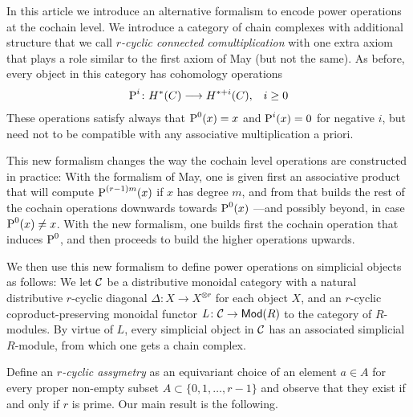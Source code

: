 In this article we introduce an alternative formalism to encode power operations at the cochain level. We introduce a category of chain complexes with additional structure that we call \emph{$r$-cyclic connected comultiplication} with one extra axiom that plays a role similar to the first axiom of May (but not the same). As before, every object in this category has cohomology operations
\begin{align*}
    \operatorname{P}^i\colon H^*(C)&\longrightarrow H^{*+i}(C), &i\geq 0
\end{align*}
These operations satisfy always that $\operatorname{P}^0(x) = x$ and $\operatorname{P}^{i}(x) = 0$ for negative $i$, but need not to be compatible with any associative multiplication a priori. %

This new formalism changes the way the cochain level operations are constructed in practice: With the formalism of May, one is given first an associative product that will compute $\operatorname{P}^{(r-1)m}(x)$ if $x$ has degree $m$, and from that builds the rest of the cochain operations downwards towards $\operatorname{P}^0(x)$ ---and possibly beyond, in case $\operatorname{P}^0(x)\neq x$. With the new formalism, one builds first the cochain operation that induces $\operatorname{P}^0$, and then proceeds to build the higher operations upwards.

We then use this new formalism to define power operations on simplicial objects as follows: We let $\mathcal{C}$ be a distributive monoidal category with a natural distributive $r$-cyclic diagonal $\Delta\colon X\to X^{\otimes r}$ for each object $X$, and an $r$-cyclic coproduct-preserving monoidal functor $\operatorname{{\it L}}\colon \mathcal{C}\to \mathsf{Mod}(R)$ to the category of $R$-modules. By virtue of $L$, every simplicial object in $\mathcal{C}$ has an associated simplicial $R$-module, from which one gets a chain complex.

Define an \emph{$r$-cyclic assymetry} as an equivariant choice of an element $a\in A$ for every proper non-empty subset $A\subset \{0,1,\ldots,r-1\}$ and observe that they exist if and only if $r$ is prime. Our main result is the following.

